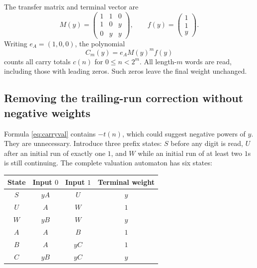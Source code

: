 \documentclass[11pt]{article}
\theoremstyle{definition}\newtheorem{definition}[theorem]{Definition}
\theoremstyle{remark}\newtheorem{remark}[theorem]{Remark}
\begin{document}
The transfer matrix and terminal vector are
\begin{equation}\label{eq:M}
 M(y)=\begin{pmatrix}1&1&0\\1&0&y\\0&y&y\end{pmatrix},
 \qquad f(y)=\begin{pmatrix}1\\1\\y\end{pmatrix}.
\end{equation}
Writing $e_A=(1,0,0)$, the polynomial
\begin{equation}\label{eq:Cm}
 C_m(y)=e_A M(y)^m f(y)
\end{equation}
counts all carry totals $c(n)$ for $0\leq n<2^m$. All length-$m$ words
are read, including those with leading zeros. Such zeros leave the final
weight unchanged.

\subsection{Removing the trailing-run correction without negative weights}
Formula \eqref{eq:carryval} contains $-t(n)$, which could suggest negative
powers of $y$. They are unnecessary. Introduce three prefix states:
$S$ before any digit is read, $U$ after an initial run of exactly one $1$,
and $W$ while an initial run of at least two $1$s is still continuing.
The complete valuation automaton has six states:
\begin{center}
\begin{tabular}{c cc c}
\toprule
State & Input $0$ & Input $1$ & Terminal weight\\
\midrule
$S$ & $yA$ & $U$ & $y$\\
$U$ & $A$ & $W$ & $1$\\
$W$ & $yB$ & $W$ & $y$\\
$A$ & $A$ & $B$ & $1$\\
$B$ & $A$ & $yC$ & $1$\\
$C$ & $yB$ & $yC$ & $y$\\
\bottomrule
\end{tabular}
\end{center}
\end{document}
